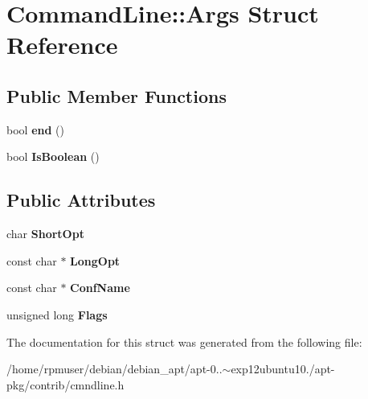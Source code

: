 \section{\-Command\-Line\-:\-:\-Args \-Struct \-Reference}
\label{structCommandLine_1_1Args}
\subsection*{\-Public \-Member \-Functions}
\begin{DoxyCompactItemize}
\item 
bool {\bfseries end} ()\label{structCommandLine_1_1Args_af545ab12986d2fe462f1013c3bafb5f3}

\item 
bool {\bfseries \-Is\-Boolean} ()\label{structCommandLine_1_1Args_a6ffce0aed1fc2f51a4c1e2358d891d8a}

\end{DoxyCompactItemize}
\subsection*{\-Public \-Attributes}
\begin{DoxyCompactItemize}
\item 
char {\bfseries \-Short\-Opt}\label{structCommandLine_1_1Args_a0a7b5c585524d78b40984f26dfabf4ce}

\item 
const char $\ast$ {\bfseries \-Long\-Opt}\label{structCommandLine_1_1Args_abb9a494e0a856c76db8bac3af568960d}

\item 
const char $\ast$ {\bfseries \-Conf\-Name}\label{structCommandLine_1_1Args_af66dc5adf2bddf96b22beefab780c8ca}

\item 
unsigned long {\bfseries \-Flags}\label{structCommandLine_1_1Args_a15eb852dd5568416ca012c6dcbff021b}

\end{DoxyCompactItemize}


\-The documentation for this struct was generated from the following file\-:\begin{DoxyCompactItemize}
\item 
/home/rpmuser/debian/debian\-\_\-apt/apt-\/0..$\sim$exp12ubuntu10./apt-\/pkg/contrib/cmndline.\-h\end{DoxyCompactItemize}
